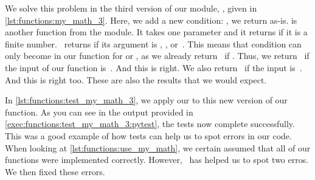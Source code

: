 %
%
%
%
%
%
%
%
%
\begin{sloppypar}%
We solve this problem in the third version of our module, , given in \cref{lst:functions:my_math_3}.
Here, we add a new condition: , we return  as-is.
 is another function from the  module.
It takes one parameter and it returns  if it is a finite number.
~returns  if its argument is , , or~.
This means that condition can only become  in our function for  or , as we already return~ if .
Thus, we return ~if the input of our function is~.
And this is right.
We also return ~if the input is~.
And this is right too.
These are also the results that we would expect.%
\end{sloppypar}%
%
In \cref{lst:functions:test_my_math_3}, we apply our  to this new version of our  function.
As you can see in the output provided in \cref{exec:functions:test_my_math_3:pytest}, the tests now complete successfully.
This was a good example of how tests can help us to spot errors in our code.
When looking at \cref{lst:functions:use_my_math}, we certain assumed that all of our functions were implemented correctly.
However, \pytest\ has helped us to spot two erros.
We then fixed these errors.%
%
%
%
